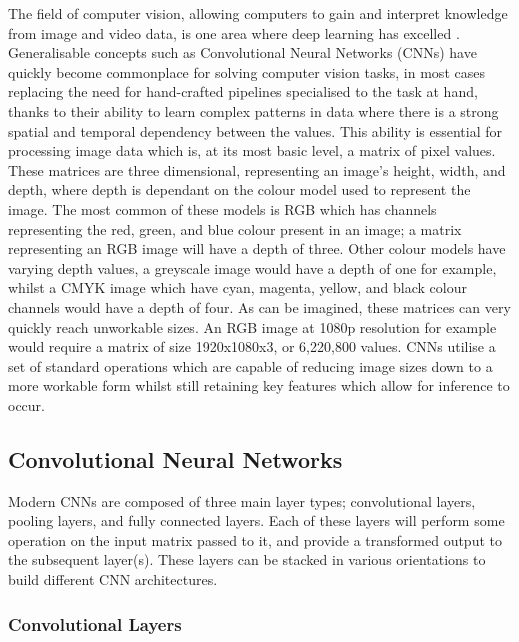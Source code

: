The field of computer vision, allowing computers to gain and interpret knowledge from image and video data, is one area where deep learning has excelled \cite{voulodimos_deep_2018}. Generalisable concepts such as Convolutional Neural Networks (CNNs) have quickly become commonplace for solving computer vision tasks, in most cases replacing the need for hand-crafted pipelines specialised to the task at hand, thanks to their ability to learn complex patterns in data where there is a strong spatial and temporal dependency between the values. This ability is essential for processing image data which is, at its most basic level, a matrix of pixel values. These matrices are three dimensional, representing an image's height, width, and depth, where depth is dependant on the colour model used to represent the image. The most common of these models is RGB which has channels representing the red, green, and blue colour present in an image; a matrix representing an RGB image will have a depth of three. Other colour models have varying depth values, a greyscale image would have a depth of one for example, whilst a CMYK image which have cyan, magenta, yellow, and black colour channels would have a depth of four. As can be imagined, these matrices can very quickly reach unworkable sizes. An RGB image at 1080p resolution for example would require a matrix of size 1920x1080x3, or 6,220,800 values. CNNs utilise a set of standard operations which are capable of reducing image sizes down to a more workable form whilst still retaining key features which allow for inference to occur. 

\subsection{Convolutional Neural Networks}\label{ch:Background,sec:CNN,sub:CNN}
Modern CNNs are composed of three main layer types; convolutional layers, pooling layers, and fully connected layers. Each of these layers will perform some operation on the input matrix passed to it, and provide a transformed output to the subsequent layer(s). These layers can be stacked in various orientations to build different CNN architectures.

\subsubsection{Convolutional Layers}\label{ch:Background,sec:CNN,sub:CNN,subsub:convolution}

